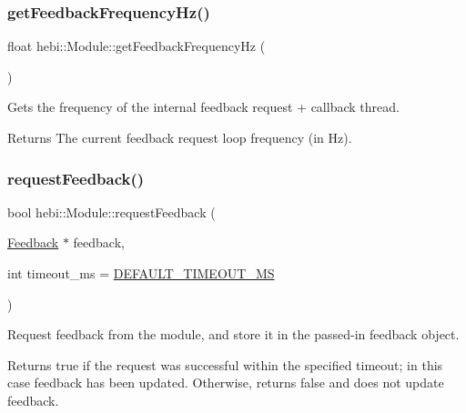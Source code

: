 \subsubsection{\texorpdfstring{get\+Feedback\+Frequency\+Hz()}{getFeedbackFrequencyHz()}}
{\footnotesize\ttfamily float hebi\+::\+Module\+::get\+Feedback\+Frequency\+Hz (\begin{DoxyParamCaption}{ }\end{DoxyParamCaption})}



Gets the frequency of the internal feedback request + callback thread. 

\begin{DoxyReturn}{Returns}
The current feedback request loop frequency (in Hz). 
\end{DoxyReturn}
\mbox{\label{classhebi_1_1Module_a5a7fa02cdcc5baf34f17c0e3badfc1e8}} 
\subsubsection{\texorpdfstring{request\+Feedback()}{requestFeedback()}}
{\footnotesize\ttfamily bool hebi\+::\+Module\+::request\+Feedback (\begin{DoxyParamCaption}\item[{\hyperlink{classhebi_1_1Feedback}{Feedback} $\ast$}]{feedback,  }\item[{int}]{timeout\+\_\+ms = {\ttfamily \hyperlink{classhebi_1_1Module_afba0d28ff83c8ddabd8f6490e412c821}{D\+E\+F\+A\+U\+L\+T\+\_\+\+T\+I\+M\+E\+O\+U\+T\+\_\+\+MS}} }\end{DoxyParamCaption})}



Request feedback from the module, and store it in the passed-\/in feedback object. 

\begin{DoxyReturn}{Returns}
true if the request was successful within the specified timeout; in this case \textquotesingle{}feedback\textquotesingle{} has been updated. Otherwise, returns false and does not update \textquotesingle{}feedback\textquotesingle{}. 
\end{DoxyReturn}
\mbox{\label{classhebi_1_1Module_a90fdca0e2c4d1ebd1cbdd3f1e05adc3c}} 
